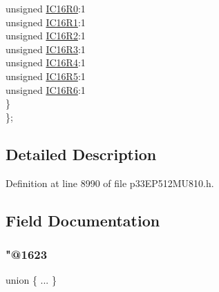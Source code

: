 \begin{DoxyCompactItemize}
\begin{tabbing}
\>\>unsigned \hyperlink{structtag_r_p_i_n_r36_b_i_t_s_af34a5f12957172b2a0515c2dc1cf71ea}{IC16R0}:1\\
\>\>unsigned \hyperlink{structtag_r_p_i_n_r36_b_i_t_s_a8bed837300321586277d7bcf9d6454f0}{IC16R1}:1\\
\>\>unsigned \hyperlink{structtag_r_p_i_n_r36_b_i_t_s_af9b9fd0a19a15ee7db57db264ca6c153}{IC16R2}:1\\
\>\>unsigned \hyperlink{structtag_r_p_i_n_r36_b_i_t_s_ababbd56e0f5cb71bbd377db04c949b5d}{IC16R3}:1\\
\>\>unsigned \hyperlink{structtag_r_p_i_n_r36_b_i_t_s_ae94ec9e4aed4e984b36447b74a52c986}{IC16R4}:1\\
\>\>unsigned \hyperlink{structtag_r_p_i_n_r36_b_i_t_s_a334369a57d226638946fd4962194a733}{IC16R5}:1\\
\>\>unsigned \hyperlink{structtag_r_p_i_n_r36_b_i_t_s_a3bd443c7534ba240bfb70c83c395991e}{IC16R6}:1\\
\>\} \\
\}; \\

\end{tabbing}\end{DoxyCompactItemize}


\subsection{Detailed Description}


Definition at line 8990 of file p33\+E\+P512\+M\+U810.\+h.



\subsection{Field Documentation}
\mbox{\label{structtag_r_p_i_n_r36_b_i_t_s_aed2e537b57b9e484b741099d15d08aea}} 
\subsubsection{\texorpdfstring{"@1623}{@1623}}
{\footnotesize\ttfamily union \{ ... \} }

\mbox{\label{structtag_r_p_i_n_r36_b_i_t_s_adf71f3d8410c1f1dbbc96680a92c49af}} 
